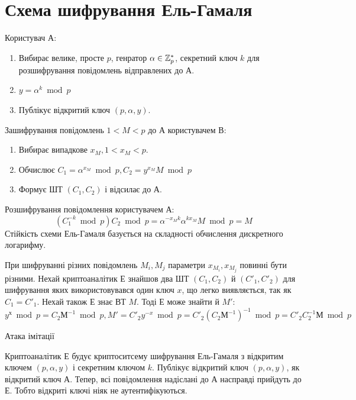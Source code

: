 \section{Схема шифрування Ель-Гамаля}
Користувач А:
\begin{enumerate}
\item 
Вибирає велике, просте  $p$, генратор $\alpha \in \mathbb Z^{*}_{p}$, 
секретний ключ $k$ для розшифрування повідомлень відправлених до А.
\item 
$ y=\alpha^k\bmod{p}$
\item 
Публікує відкритий ключ $(p, \alpha, y)$.
\end{enumerate}
Зашифрування повідомлень $1<M<p$ до А користувачем В:
\begin{enumerate}
\item 
Вибирає випадкове $x_{M}, 1<x_{M}<p$. 
\item 
Обчислює $C_{1}=\alpha^{x_{M}}\bmod{p}, C_{2}=y^{x_{M}}M\bmod{p}$
\item
Формує ШТ $(C_{1},  C_{2})$ і відсилає до А.
\end{enumerate}
Розшифрування повідомлення користувачем А:
$$(C_{1}^{-k}\bmod{p})C_{2}\bmod{p}= \alpha^{-x_{M}k}\alpha^{kx_{M}}M\bmod{p}=M$$
Стійкість схеми Ель-Гамаля базується на складності обчислення дискретного логарифму.\par
\begin{remark}
При шифруванні різних повідомлень $M_{i}, M_{j}$ параметри $x_{M_{i}}, x_{M_{j}}$ повинні бути різними.
Нехай криптоаналітик Е знайшов два ШТ $(C_{1},  C_{2})$ й $(C'_{1},  C'_{2})$ для шифрування яких використовувався один ключ $x$, що легко виявляється, так як  $C_{1}=C'_{1}$.
Нехай також Е знає ВТ $M$. Тоді Е може знайти й $M'$: $$ y^{х}\bmod{p}=C_{2}М^{-1}\bmod{p}, M'=C'_{2}y^{-x}\bmod{p}=C'_{2}(C_{2}М^{-1})^{-1}\bmod{p}=C'_{2}C_{2}^{-1}М\bmod{p}$$
\end{remark}
Атака імітації\par
Криптоаналітик Е будує криптоситсему шифрування Ель-Гамаля з відкритим ключем $(p,\alpha,y)$ і секретним ключом $k$.
Публікує відкритий ключ $(p,\alpha,y)$, як відкритий ключ А. Тепер, всі повідомлення надіслані до А насправді прийдуть до Е.
Тобто відкриті ключі ніяк не аутентифікуються.\par

